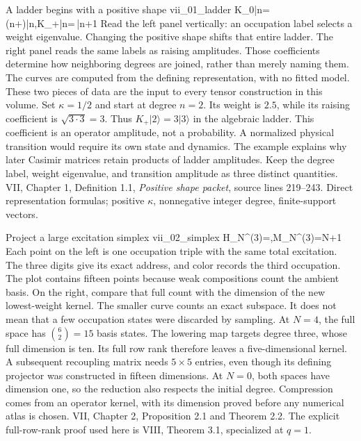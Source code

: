 
{A ladder begins with a positive shape}
{vii_01_ladder}
{K_0|n\rangle=(n+\kappa)|n\rangle,\qquad K_+|n\rangle=\,|n+1\rangle}
{Read the left panel vertically: an occupation label selects a weight eigenvalue. Changing the positive shape shifts that entire ladder. The right panel reads the same labels as raising amplitudes. Those coefficients determine how neighboring degrees are joined, rather than merely naming them. The curves are computed from the defining representation, with no fitted model. These two pieces of data are the input to every tensor construction in this volume.}
{Set $\kappa=1/2$ and start at degree $n=2$. Its weight is $2.5$, while its raising coefficient is $\sqrt{3\cdot3}=3$. Thus $K_+|2\rangle=3|3\rangle$ in the algebraic ladder. This coefficient is an operator amplitude, not a probability. A normalized physical transition would require its own state and dynamics. The example explains why later Casimir matrices retain products of ladder amplitudes.}
{Keep the degree label, weight eigenvalue, and transition amplitude as three distinct quantities.}
{VII, Chapter 1, Definition 1.1, \emph{Positive shape packet}, source lines 219--243. Direct representation formulas; positive $\kappa$, nonnegative integer degree, finite-support vectors.}

{Project a large excitation simplex}
{vii_02_simplex}
{\dim H_N^{(3)}=,\qquad \dim M_N^{(3)}=N+1}
{Each point on the left is one occupation triple with the same total excitation. The three digits give its exact address, and color records the third occupation. The plot contains fifteen points because weak compositions count the ambient basis. On the right, compare that full count with the dimension of the new lowest-weight kernel. The smaller curve counts an exact subspace. It does not mean that a few occupation states were discarded by sampling.}
{At $N=4$, the full space has $\binom62=15$ basis states. The lowering map targets degree three, whose full dimension is ten. Its full row rank therefore leaves a five-dimensional kernel. A subsequent recoupling matrix needs $5\times5$ entries, even though its defining projector was constructed in fifteen dimensions. At $N=0$, both spaces have dimension one, so the reduction also respects the initial degree.}
{Compression comes from an operator kernel, with its dimension proved before any numerical atlas is chosen.}
{VII, Chapter 2, Proposition 2.1 and Theorem 2.2. The explicit full-row-rank proof used here is VIII, Theorem 3.1, specialized at $q=1$.}


